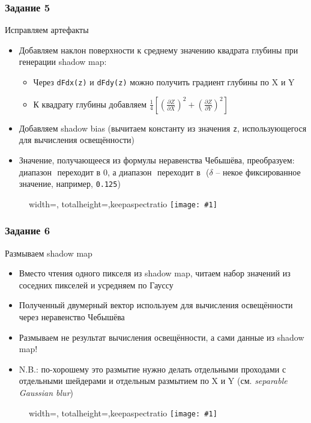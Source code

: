 \documentclass{beamer}
\newcommand{\slideimage}[1]{
  \begin{figure}
    \begin{adjustbox}{width=\textwidth, totalheight=\textheight-2\baselineskip-2\baselineskip,keepaspectratio}
      \texttt{[image: \#1]}
    \end{adjustbox}
  \end{figure}
}
\begin{document}
\begin{frame}[fragile]
\frametitle{Задание 5}
Исправляем артефакты
\begin{itemize}
\item Добавляем наклон поверхности к среднему значению квадрата глубины при генерации shadow map:
\begin{itemize}
\item Через \verb|dFdx(z)| и \verb|dFdy(z)| можно получить градиент глубины по X и Y
\item К квадрату глубины добавляем \begin{math}\frac{1}{4}\left[\left(\frac{\partial Z}{\partial X}\right)^2 + \left(\frac{\partial Z}{\partial Y}\right)^2\right]\end{math}
\end{itemize}
\item Добавляем shadow bias (вычитаем константу из значения \verb|z|, использующегося для вычисления освещённости)
\item Значение, получающееся из формулы неравенства Чебышёва, преобразуем: диапазон \begin{math}[0, \delta]\end{math} переходит в \begin{math}0\end{math}, а диапазон \begin{math}[\delta, 1]\end{math} переходит в \begin{math}[0, 1]\end{math} (\begin{math}\delta\end{math} -- некое фиксированное значение, например, \verb|0.125|)
\end{itemize}
\end{frame}

\begin{frame}[fragile]
\slideimage{5.png}
\end{frame}

\begin{frame}[fragile]
\frametitle{Задание 6}
Размываем shadow map
\begin{itemize}
\item Вместо чтения одного пикселя из shadow map, читаем набор значений из соседних пикселей и усредняем по Гауссу
\item Полученный двумерный вектор используем для вычисления освещённости через неравенство Чебышёва
\item Размываем не результат вычисления освещённости, а сами данные из shadow map!
\item {\color{red}N.B.}: по-хорошему это размытие нужно делать отдельными проходами с отдельными шейдерами и отдельным размытием по X и Y (см. \textit{separable Gaussian blur})
\end{itemize}
\end{frame}

\begin{frame}[fragile]
\slideimage{6.png}
\end{frame}
\end{document}
